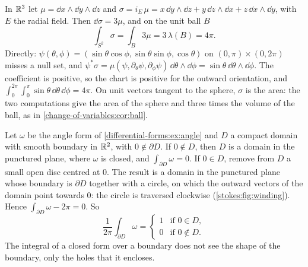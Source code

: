 \begin{notechapter}
\begin{example}\label{stokes:ex:sphere}
In $\mathbb{R}^3$ let $\mu = \dd x\wedge\dd y\wedge\dd z$ and
$\sigma = i_E\,\mu = x\,\dd y\wedge\dd z + y\,\dd z\wedge\dd x
+ z\,\dd x\wedge\dd y$, with $E$ the radial field. Then
$\dd\sigma = 3\mu$, and on the unit ball $B$
\[
  \int_{S^2}\sigma = \int_B3\mu = 3\,\lambda(B) = 4\pi .
\]
Directly: $\psi(\theta, \phi)
= (\sin\theta\cos\phi, \sin\theta\sin\phi, \cos\theta)$ on
$(0, \pi)\times(0, 2\pi)$ misses a null set, and
$\psi^*\sigma = \mu(\psi, \partial_\theta\psi, \partial_\phi\psi)\,
\dd\theta\wedge\dd\phi = \sin\theta\,\dd\theta\wedge\dd\phi$. The
coefficient is positive, so the chart is positive for the outward
orientation, and $\int_0^{2\pi}\!\int_0^\pi\sin\theta\,\dd\theta\,
\dd\phi = 4\pi$. On unit vectors tangent to the sphere, $\sigma$ is the
area: the two computations give the area of the sphere and three times
the volume of the ball, as in \cref{change-of-variables:cor:ball}.
\end{example}

\begin{example}[Winding]\label{stokes:ex:winding}
Let $\omega$ be the angle form of \cref{differential-forms:ex:angle}
and $D$ a compact domain with smooth boundary in $\mathbb{R}^2$, with
$0\notin\partial D$. If $0\notin D$, then $D$ is a domain in the
punctured plane, where $\omega$ is closed, and
$\int_{\partial D}\omega = 0$. If $0\in D$, remove from $D$ a small
open disc centred at $0$. The result is a domain in the punctured
plane whose boundary is $\partial D$ together with a circle, on which
the outward vectors of the domain point towards $0$: the circle is
traversed clockwise (\cref{stokes:fig:winding}). Hence
$\int_{\partial D}\omega - 2\pi = 0$. So
\[
  \frac1{2\pi}\int_{\partial D}\omega =
  \begin{cases}1 & \text{if }0\in D ,\\ 0 & \text{if }0\notin D .
  \end{cases}
\]
The integral of a closed form over a boundary does not see the shape of
the boundary, only the holes that it encloses.
\end{example}


\end{notechapter}
